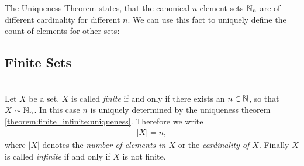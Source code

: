 The Uniqueness Theorem states, that the canonical $n$-element sets $\mathbb{N}_n$ are of different cardinality for different $n$. We can use this fact to uniquely define the count of elements for other sets:

\subsection{Finite Sets}

\begin{definition}~\\
    Let $X$ be a set. $X$ is called \emph{finite} if and only if there exists an $n\in\mathbb{N}$, so that $X\sim\mathbb{N}_n$. In this case $n$ is uniquely determined by the uniqueness theorem \ref{theorem:finite_infinite:uniqueness}. Therefore we write \begin{align}|X|=n,\end{align}
    where $|X|$ denotes the \emph{number of elements in $X$} or the \emph{cardinality of $X$}. Finally $X$ is called \emph{infinite} if and only if $X$ is not finite.
\end{definition}

